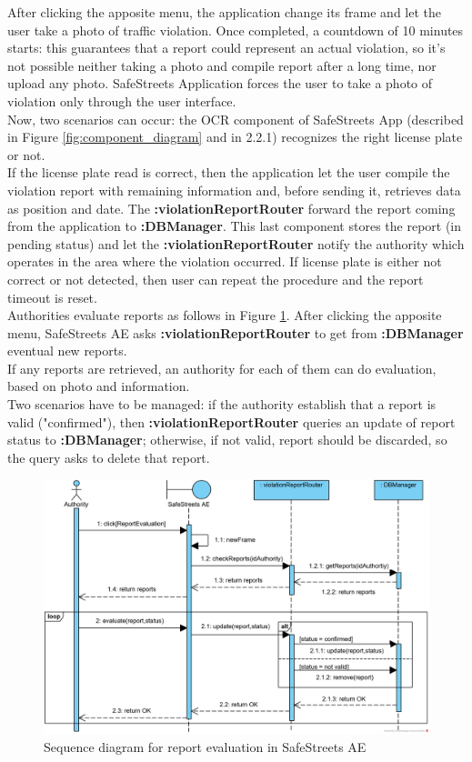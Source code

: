 \documentclass{article}
\begin{document}
			After clicking the apposite menu, the application change its frame and let the user take a photo of traffic violation. Once completed, a countdown of 10 minutes starts: this guarantees that a report could represent an actual violation, so it's not possible neither taking a photo and compile report after a long time, nor upload any photo. SafeStreets Application forces the user to take a photo of violation only through the user interface.\\
			Now, two scenarios can occur: the OCR component of SafeStreets App (described in Figure \ref{fig:component_diagram} and in 2.2.1) recognizes the right license plate or not.\\
			If the license plate read is correct, then the application let the user compile the violation report with remaining information and, before sending it, retrieves data as position and date. 
			The \textbf{:violationReportRouter} forward the report coming from the application to \textbf{:DBManager}.
			This last component stores the report (in pending status) and let the \textbf{:violationReportRouter} notify the authority which operates in the area where the violation occurred. 
			If license plate is either not correct or not detected, then user can repeat the procedure and the report timeout is reset.\\
			
			Authorities evaluate reports as follows in Figure \ref{fig:sd-reportEvaluation}.
			After clicking the apposite menu, SafeStreets AE asks \textbf{:violationReportRouter} to get from \textbf{:DBManager} eventual new reports.\\
			If any reports are retrieved, an authority for each of them can do evaluation, based on photo and information.\\
			Two scenarios have to be managed: if the authority establish that a report is valid ("confirmed"), then \textbf{:violationReportRouter} queries an update of report status to \textbf{:DBManager}; otherwise, if not valid, report should be discarded, so the query asks to delete that report.
			
			\begin{figure}[H]
				\includegraphics [scale=0.8] {diagrams/DD_SeqD_ReportEvaluation.png}
				\caption[Sequence diagram]{Sequence diagram for report evaluation in SafeStreets AE}
				\label{fig:sd-reportEvaluation}
			\end{figure}
			
\end{document}
